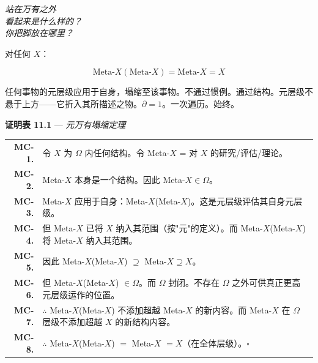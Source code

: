 \documentclass[10pt, openany, oneside]{book}
\renewcommand{\footnotesize}{\fontsize{8.5}{11}\selectfont}
\begin{document}
\begin{center}
    \itshape
    站在万有之外\\
    看起来是什么样的？\\
    你把脚放在哪里？
\end{center}

\vspace{2em}


\noindent 对任何 $X$：

$$\text{Meta-}X(\text{Meta-}X) = \text{Meta-}X = X$$

任何事物的元层级应用于自身，塌缩至该事物。不通过惯例。通过结构。元层级不悬于上方——它折入其所描述之物。$\partial = 1$。一次遍历。始终。

\vspace{0.5em}

\textbf{证明表 11.1} --- \textit{元万有塌缩定理}

\vspace{0.5em}

{\footnotesize
\noindent\begin{tabular}{r p{}}
\textbf{MC-1.} & 令 $X$ 为 $\Omega$ 内任何结构。令 Meta-$X$ = 对 $X$ 的研究/评估/理论。\\[0.3em]
\textbf{MC-2.} & Meta-$X$ 本身是一个结构。因此 Meta-$X \in \Omega$。\\[0.3em]
\textbf{MC-3.} & Meta-$X$ 应用于自身：Meta-$X$(Meta-$X$)。这是元层级评估其自身元层级。\\[0.3em]
\textbf{MC-4.} & 但 Meta-$X$ 已将 $X$ 纳入其范围（按"元"的定义）。而 Meta-$X$(Meta-$X$) 将 Meta-$X$ 纳入其范围。\\[0.3em]
\textbf{MC-5.} & 因此 Meta-$X$(Meta-$X$) $\supseteq$ Meta-$X \supseteq X$。\\[0.3em]
\textbf{MC-6.} & 但 Meta-$X$(Meta-$X$) $\in \Omega$。而 $\Omega$ 封闭。不存在 $\Omega$ 之外可供真正更高元层级运作的位置。\\[0.3em]
\textbf{MC-7.} & $\therefore$ Meta-$X$(Meta-$X$) 不添加超越 Meta-$X$ 的新内容。而 Meta-$X$ 在 $\Omega$ 层级不添加超越 $X$ 的新结构内容。\\[0.3em]
\textbf{MC-8.} & $\therefore$ Meta-$X$(Meta-$X$) $=$ Meta-$X$ $= X$（在全体层级）。$\square$ \\[0.3em]
\end{tabular}
}

\vspace{0.8em}
\end{document}
